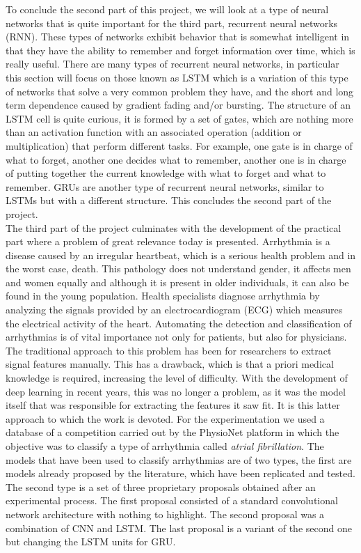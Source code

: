     To conclude the second part of this project, we will look at a type of neural networks that is quite important for the third part, recurrent neural networks (RNN). These types of networks exhibit behavior that is somewhat intelligent in that they have the ability to remember and forget information over time, which is really useful. There are many types of recurrent neural networks, in particular this section will focus on those known as LSTM which is a variation of this type of networks that solve a very common problem they have, and the short and long term dependence caused by gradient fading and/or bursting. The structure of an LSTM cell is quite curious, it is formed by a set of gates, which are nothing more than an activation function with an associated operation (addition or multiplication) that perform different tasks. For example, one gate is in charge of what to forget, another one decides what to remember, another one is in charge of putting together the current knowledge with what to forget and what to remember. GRUs are another type of recurrent neural networks, similar to LSTMs but with a different structure. This concludes the second part of the project. \\
    
    
    
    The third part of the project culminates with the development of the practical part where a problem of great relevance today is presented. Arrhythmia is a disease caused by an irregular heartbeat, which is a serious health problem and in the worst case, death. This pathology does not understand gender, it affects men and women equally and although it is present in older individuals, it can also be found in the young population. Health specialists diagnose arrhythmia by analyzing the signals provided by an electrocardiogram (ECG) which measures the electrical activity of the heart. Automating the detection and classification of arrhythmias is of vital importance not only for patients, but also for physicians. \\
    
    The traditional approach to this problem has been for researchers to extract signal features manually. This has a drawback, which is that a priori medical knowledge is required, increasing the level of difficulty. With the development of deep learning in recent years, this was no longer a problem, as it was the model itself that was responsible for extracting the features it saw fit. It is this latter approach to which the work is devoted. For the experimentation we used a database of a competition carried out by the PhysioNet platform in which the objective was to classify a type of arrhythmia called \textit{atrial fibrillation}. The models that have been used to classify arrhythmias are of two types, the first are models already proposed by the literature, which have been replicated and tested. The second type is a set of three proprietary proposals obtained after an experimental process. The first proposal consisted of a standard convolutional network architecture with nothing to highlight. The second proposal was a combination of CNN and LSTM. The last proposal is a variant of the second one but changing the LSTM units for GRU. \\
    

